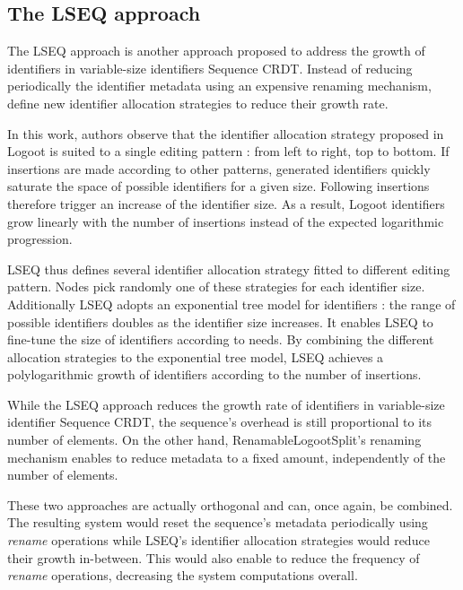 \documentclass[sigplan,10pt]{acmart}
\begin{document}
\subsection{The LSEQ approach}

The LSEQ approach \cite{nedelec_2013_lseq, doi:10.1002/cpe.4108} is another approach proposed to address the growth of identifiers in variable-size identifiers Sequence \ac{CRDT}. Instead of reducing periodically the identifier metadata using an expensive renaming mechanism, \citeauthor{nedelec_2013_lseq} define new identifier allocation strategies to reduce their growth rate.

In this work, authors observe that the identifier allocation strategy proposed in Logoot\cite{WeissICDCS09} is suited to a single editing pattern : from left to right, top to bottom.
If insertions are made according to other patterns, generated identifiers quickly saturate the space of possible identifiers for a given size.
Following insertions therefore trigger an increase of the identifier size.
As a result, Logoot identifiers grow linearly with the number of insertions instead of the expected logarithmic progression.

LSEQ thus defines several identifier allocation strategy fitted to different editing pattern.
Nodes pick randomly one of these strategies for each identifier size.
Additionally LSEQ adopts an exponential tree model for identifiers : the range of possible identifiers doubles as the identifier size increases.
It enables LSEQ to fine-tune the size of identifiers according to needs.
By combining the different allocation strategies to the exponential tree model, LSEQ achieves a polylogarithmic growth of identifiers according to the number of insertions.

While the LSEQ approach reduces the growth rate of identifiers in variable-size identifier Sequence \ac{CRDT}, the sequence's overhead is still proportional to its number of elements.
On the other hand, RenamableLogootSplit's renaming mechanism enables to reduce metadata to a fixed amount, independently of the number of elements.

These two approaches are actually orthogonal and can, once again, be combined.
The resulting system would reset the sequence's metadata periodically using \emph{rename} operations while LSEQ's identifier allocation strategies would reduce their growth in-between.
This would also enable to reduce the frequency of \emph{rename} operations, decreasing the system computations overall.
\end{document}
